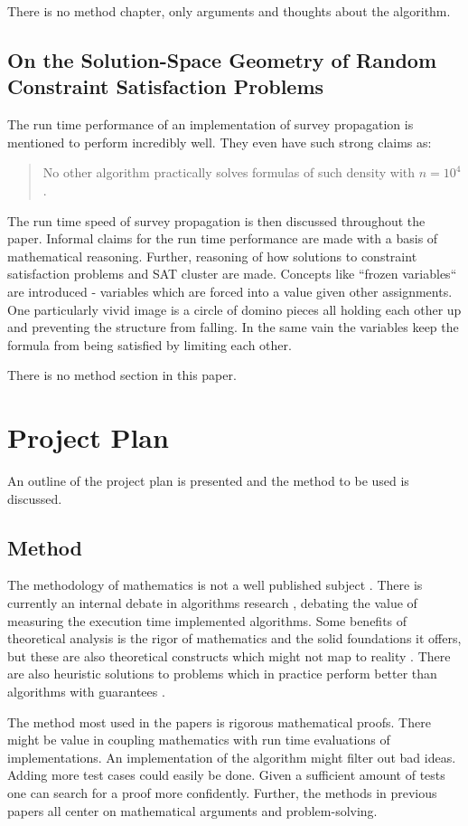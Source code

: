 \documentclass[msc,lith,english]{liuthesis}
\begin{document}
There is no method chapter, only arguments and thoughts about the algorithm.

\section{On the Solution-Space Geometry of Random Constraint Satisfaction Problems}
The run time performance of an implementation of survey propagation is mentioned to perform incredibly well.
They even have such strong claims as:
\blockquote{No other algorithm practically solves formulas of such density with $n=10^4$.}
\cite{sourceSolutionSpace}

The run time speed of survey propagation is then discussed throughout the paper.
Informal claims for the run time performance are made with a basis of mathematical reasoning.
Further, reasoning of how solutions to constraint satisfaction problems and SAT cluster are made.
Concepts like ``frozen variables`` are introduced - variables which are forced into a value given other assignments.
One particularly vivid image is a circle of domino pieces all holding each other up and preventing the structure from falling.
In the same vain the variables keep the formula from being satisfied by limiting each other.

There is no method section in this paper.

\chapter{Project Plan}
An outline of the project plan is presented and the method to be used is discussed.

\section{Method}
The methodology of mathematics is not a well published subject \cite{sourceMethodMath}.
There is currently an internal debate in algorithms research \cite{sourceUllman}, debating the value of measuring the execution time implemented algorithms.
Some benefits of theoretical analysis is the rigor of mathematics and the solid foundations it offers, but these are also theoretical constructs which might not map to reality \cite{sourceAlgorithmEngineeering}.
There are also heuristic solutions to problems which in practice perform better than algorithms with guarantees \cite{sourceSolutionSpace,sourceSurveyProp}.

The method most used in the papers is rigorous mathematical proofs. There might be value in coupling mathematics with run time evaluations of implementations.
An implementation of the algorithm might filter out bad ideas.
Adding more test cases could easily be done.
Given a sufficient amount of tests one can search for a proof more confidently.
Further, the methods in previous papers all center on mathematical arguments and problem-solving.
\end{document}
